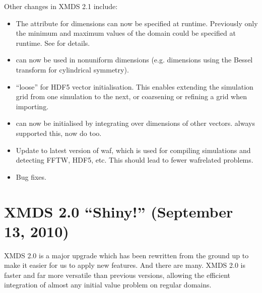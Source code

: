 \documentclass[letterpaper,10pt,english]{sphinxmanual}
\begin{document}
\sphinxAtStartPar
Other changes in XMDS 2.1 include:
\begin{itemize}
\item {} 
\sphinxAtStartPar
The  attribute for dimensions can now be specified at run\sphinxhyphen{}time.  Previously only the minimum and maximum values of the domain could be specified at run\sphinxhyphen{}time.  See {\hyperref[\detokenize{reference_elements:validation}]{}} for details.

\item {} 
\sphinxAtStartPar
{} can now be used in non\sphinxhyphen{}uniform dimensions (e.g. dimensions using the Bessel transform for cylindrical symmetry).

\item {} 
\sphinxAtStartPar
“loose”  for HDF5 vector initialisation.  This enables extending the simulation grid from one simulation to the next, or coarsening or refining a grid when importing.

\item {} 
\sphinxAtStartPar
{} can now be initialised by integrating over dimensions of other vectors.   always supported this, now  do too.

\item {} 
\sphinxAtStartPar
Update to latest version of waf, which is used for compiling simulations and detecting FFTW, HDF5, etc. This should lead to fewer waf\sphinxhyphen{}related problems.

\item {} 
\sphinxAtStartPar
Bug fixes.

\end{itemize}


\section{XMDS 2.0 “Shiny!” (September 13, 2010)}
\label{\detokenize{news:xmds-2-0-shiny-september-13-2010}}
\sphinxAtStartPar
XMDS 2.0 is a major upgrade which has been rewritten from the ground up to make it easier for us to apply new features. And there are many. XMDS 2.0 is faster and far more versatile than previous versions, allowing the efficient integration of almost any initial value problem on regular domains.
\end{document}
